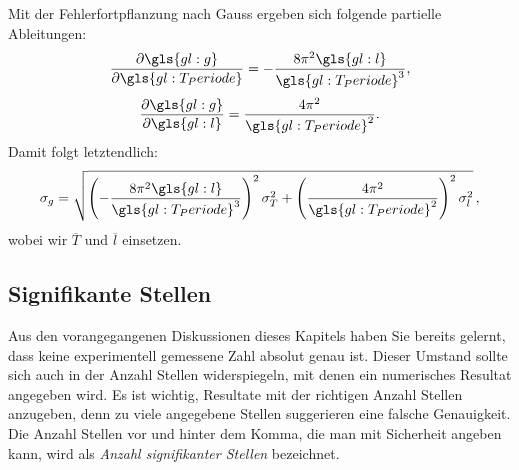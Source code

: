 Mit der Fehlerfortpflanzung nach Gauss ergeben sich folgende partielle Ableitungen:
\begin{align}
\frac{\partial \gls{gl:g}}{\partial \gls{gl:T_Periode}} = - \frac{8 \pi^2 \gls{gl:l}}{\gls{gl:T_Periode}^3},
\end{align}
\begin{align}
\frac{\partial \gls{gl:g}}{\partial \gls{gl:l}}  =   \frac{4 \pi^2}{\gls{gl:T_Periode}^2}.
\label{eq:vl3-7}
\end{align}
Damit folgt letztendlich:
\begin{align}
\sigma_g = \sqrt{ \left(  - \frac{8 \pi^2 \gls{gl:l}}{\gls{gl:T_Periode}^3} \right)^2 \sigma^2_T + \left(\frac{4 \pi^2}{\gls{gl:T_Periode}^2} \right)^2 \sigma^2_l }\,,
\label{eq:vl3-8}
\end{align}
wobei wir $\overline{T}$ und $\overline{l}$ einsetzen.



\subsection{Signifikante Stellen}
Aus den vorangegangenen Diskussionen dieses Kapitels haben Sie bereits gelernt, dass keine experimentell gemessene Zahl absolut genau ist. Dieser Umstand sollte sich auch in der Anzahl Stellen widerspiegeln, mit denen ein numerisches Resultat angegeben wird. Es ist wichtig, Resultate mit der richtigen Anzahl Stellen anzugeben, denn zu viele angegebene Stellen suggerieren eine falsche Genauigkeit. Die Anzahl Stellen vor und hinter dem Komma, die man mit Sicherheit angeben kann, wird als \textit{Anzahl signifikanter Stellen} bezeichnet. \\

